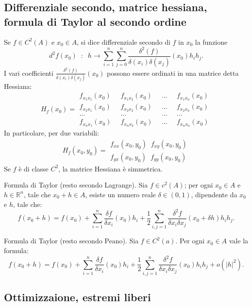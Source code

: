 \subsection*{Differenziale secondo, matrice hessiana, formula di Taylor al secondo ordine}
Se $f \in C^2(A)$ e $x_0 \in A$, si dice differenziale secondo di $f$ in $x_0$ la funzione
\[
    d^2f(x_0) \;\;:\;\; h \rightarrow \sum_{i=1}^{n}\sum_{j=0}^{n}\frac{\delta^2(f)}{\delta(x_i) \delta(x_j)}(x_0)h_ih_j.
\]
I vari coefficienti $\frac{\delta^2(f)}{\delta(x_i) \delta(x_j)}(x_0)$ possono essere ordinati in una matrice detta Hessiana:
\[
    H_f(x_0) =\begin{matrix}
        f_{x_1x_1}(x_0) \;\; &f_{x_1x_2}(x_0) \;\; &\dots \;\; &f_{x_1x_n}(x_0)\\
        f_{x_2x_1}(x_0) \;\; &f_{x_2x_2}(x_0) \;\; &\dots \;\; &f_{x_2x_n}(x_0)\\
        \dots \;\; &\dots \;\; &\dots \;\; &\dots\\
        f_{x_nx_1}(x_0) \;\; &f_{x_nx_2}(x_0) \;\; &\dots \;\; &f_{x_nx_n}(x_0)
    \end{matrix}
\]  
In particolare, per due variabili:
\[
    H_f(x_0, y_0) = \begin{matrix}
        f_{xx}(x_0, y_0) \;\; f_{xy}(x_0, y_0)\\
        f_{yx}(x_0, y_0) \;\; f_{yy}(x_0, y_0)
    \end{matrix}
\]
Se $f$ è di classe $C^2$, la matrice Hessiana è simmetrica.\newline

Formula di Taylor (resto secondo Lagrange). Sia $f \in c^2(A)$; per ogni $x_0 \in A$ e $h \in \mathbb{R}^n$, tale che $x_0 + h \in A$, esiste un numero reale $\delta \in (0,1)$, dipendente da $x_0$ e $h$, tale che:
\[
    f(x_0 + h) = f(x_0) +\sum_{i=1}^{n}\frac{\delta f}{\delta x_i}(x_0)h_i + \frac{1}{2}\sum_{i,j=1}^{n}\frac{\delta^2f}{\delta x_i \delta x_j}(x_0 + \delta h) h_i h_j.
\]\newline

Formula di Taylor (resto secondo Peano). Sia $f \in C^2(a)$. Per ogni $x_0 \in A$ vale la formula:
\[
    f(x_0 + h) = f(x_0) +\sum_{i=1}^{n}\frac{\delta f}{\delta x_i}(x_0)h_i + \frac{1}{2}\sum_{i,j=1}^{n}\frac{\delta^2f}{\delta x_i \delta x_j}(x_0) h_i h_j +o(|h|^2).
\]

\subsection*{Ottimizzaione, estremi liberi}

